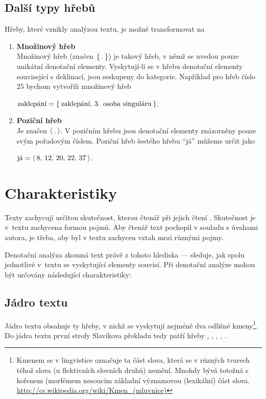 \documentclass[dp.tex]{subfiles}
\begin{document}
\subsection{Další typy hřebů}
Hřeby, které vznikly analýzou textu, je možné transformovat na
\begin{enumerate}
\item \textbf{Množinový hřeb}\\
Množinový hřeb (značen $\{\kern 2pt.\kern 2pt\}$) je takový hřeb, v němž se uvedou pouze unikátní denotační elementy. Vyskytují-li se v hřebu denotační elementy související s deklinací, jsou seskupeny do kategorie. Například pro hřeb číslo $25$ bychom vytvořili množinový hřeb

$\text{zaklepání} = \{\kern 2pt \text{zaklepání, 3. osoba singuláru} \kern 2pt\}$.

\item \textbf{Poziční hřeb}\\
Je značen $\langle \kern 2pt.\kern 2pt\rangle$. V pozičním hřebu jsou denotační elementy znázorněny pouze svým pořadovým číslem. Poziční hřeb šestého hřebu \enquote{já} můžeme určit jako

$\text{já} = \langle \kern 2pt \text{8, 12, 20, 22, 37} \kern 2pt\rangle$.
\end{enumerate}

\section{Charakteristiky}

Texty zachycují určitou skutečnost, kterou čtenář při jejich čtení . Skutečnost je v~textu zachycena formou pojmů. Aby čtenář text pochopil v souladu s úvahami autora, je třeba, aby byl v textu zachycen vztah mezi různými pojmy.

Denotační analýza zkoumá text právě z tohoto hlediska --- sleduje, jak spolu jednotlivé v~textu se vyskytující elementy souvisí. Při denotační analýze mohou být určovány následující charakteristiky:

\subsection{Jádro textu}
Jádro textu obsahuje ty hřeby, v nichž se vyskytují nejméně dva odlišné kmeny\footnote{Kmenem se v lingvistice označuje ta část slova, která se v různých tvarech téhož slova (u flektivních slovních druhů) nemění. Mnohdy bývá totožná s kořenem (morfémem nesoucím základní významovou (lexikální) část slova. \url{http://cs.wikipedia.org/wiki/Kmen_(mluvnice)} }. Do jádra textu první strofy Slavíkova překladu tedy patří hřeby , , , , .
\end{document}
